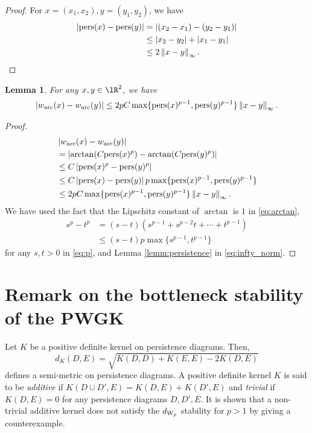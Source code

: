 \documentclass{article}
\newtheorem{lem}[thm]{Lemma}
\newcommand{\pers}{{\rm pers}}
\providecommand{\abs}[1]{\left\lvert#1\right\rvert}
\providecommand{\norm}[1]{\left\lVert#1\right\rVert}
\begin{document}
\begin{proof}
For $x=(x_{1},x_{2}),y=(y_{1},y_{2})$, we have
\begin{align}
| \pers(x)-\pers(y) |
&= |(x_{2}-x_{1}) - (y_{2}-y_{1})| \nonumber \\
&\leq |x_{2}-y_{2}|+|x_{1}-y_{1}| \nonumber \\
&\leq 2 \norm{x-y}_{\infty}. \nonumber
\end{align}
\end{proof}

\begin{lem}
\label{lemm:w_continuous}
For any $x,y \in \lR^{2}$, we have 
\begin{align*}
\abs{w_{{\rm arc}}(x)-w_{{\rm arc}}(y)}  \leq 2pC \max \{\pers(x)^{p-1}, \pers(y)^{p-1}\} \norm{x-y}_{\infty}.
\end{align*}
\end{lem}

\begin{proof}
\begin{align}
&\abs{w_{{\rm arc}}(x)-w_{{\rm arc}}(y) } \nonumber \\
&=\abs{ \arctan(C \pers(x)^{p})-\arctan(C \pers(y)^{p}) } \label{eq:arctan} \\
& \leq C \abs{ \pers(x)^{p}-\pers(y)^{p}} \nonumber \\
& \leq C \abs{\pers(x)-\pers(y)} p \max \{\pers(x)^{p-1}, \pers(y)^{p-1}\} \label{eq:p}\\
& \leq 2 pC \max \{\pers(x)^{p-1}, \pers(y)^{p-1}\} \norm{x-y}_{\infty} \label{eq:infty_norm}. 
\end{align}
We have used the fact that the Lipschitz constant of $\arctan$ is $1$ in \eqref{eq:arctan},
\begin{align*}
s^{p}-t^{p} 
&=(s-t)(s^{p-1}+s^{p-2}t+\cdots+t^{p-1}) \\
& \leq (s-t) p \max \{ s^{p-1},t^{p-1}\}
\end{align*}
for any $s,t >0$ in \eqref{eq:p}, and Lemma \ref{lemm:persistence} in \eqref{eq:infty_norm}.
\end{proof}

\section{Remark on the bottleneck stability of the PWGK}
\label{sec:additive}
Let $K$ be a positive definite kernel on persistence diagrams.
Then, 
\[
d_{K}(D,E) = \sqrt{K(D,D) + K(E,E) -2K(D,E)}
\]
defines a semi-metric on persistence diagrams.
A positive definite kernel $K$ is said to be {\em additive} if $K(D \cup D', E) = K(D,E) + K(D',E)$ and {\em trivial} if $K(D,E) = 0$ for any persistence diagrams $D,D',E$. 
It is shown that a non-trivial additive kernel does not satisfy the $d_{ {\rm W}_{p}}$ stability for $p>1$ by giving a counterexample.
\end{document}
